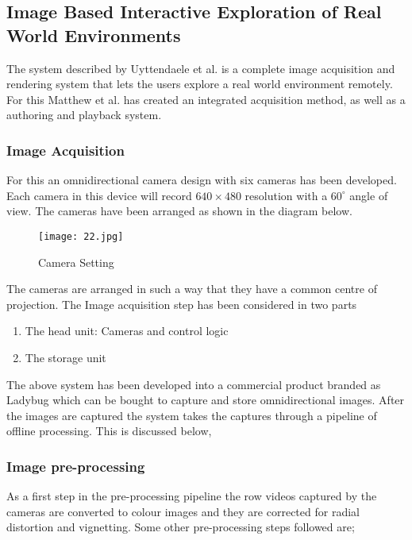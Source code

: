 \subsection{Image Based Interactive Exploration of Real World Environments}
The system described by Uyttendaele et al. \cite{Uyttendaele2004} is a complete image acquisition and rendering system that lets the users explore a real world environment remotely. For this Matthew et al. has created an integrated acquisition method, as well as a authoring and playback system. 

\subsubsection{Image Acquisition}
For this an omnidirectional camera design with six cameras has been developed. Each camera in this device will record $640\times480$ resolution with a $60^{\circ}$ angle of view. The cameras have been arranged as shown in the diagram below.

\begin{figure}[htbp]
\sidecaption
\texttt{[image: 22.jpg]}
\caption{Camera Setting}
\label{Fig_22_cam_setting}       %
\end{figure}

The cameras are arranged in such a way that they have a common centre of projection.
The Image acquisition step has been considered in two parts
\begin{enumerate}
\item The head unit: Cameras and control logic
\item The storage unit
\end{enumerate}
The above system has been developed into a commercial product branded as Ladybug \cite{ladybug} which can be bought to capture and store omnidirectional images. After the images are captured the system takes the captures through a pipeline of offline processing. This is discussed below,

\subsubsection{Image pre-processing}
As a first step in the pre-processing pipeline the row videos captured by the cameras are converted to colour images and they are corrected for radial distortion and vignetting.
Some other pre-processing steps followed are;

